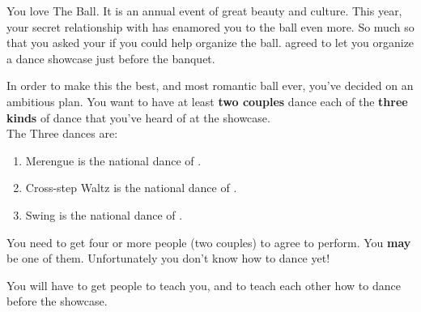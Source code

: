 \documentclass[green]{NeptuneBall}
\begin{document}
\name{\gDance{}}

You love The \cExExKing{} Ball. It is an annual event of great beauty and culture. This year, your secret relationship with \cDiplomat{} has enamored you to the ball even more. So much so that you asked your \cKing{\parent} if you could help organize the ball. \cKing{} agreed to let you organize a dance showcase just before the banquet.

In order to make this the best, and most romantic ball ever, you've decided on an ambitious plan.  You want to have at least {\bf two couples} dance each of the {\bf three  kinds} of dance that you've heard of at the showcase.\\

The Three dances are:
\begin{enumerate}
\item Merengue is the national dance of \pAtlantis{}.
\item Cross-step Waltz is the national dance of \pPacifica{}.
\item Swing is the national dance of \pAmerica{}.
\end{enumerate}

You need to get four or more people (two couples) to agree to perform. You {\bf may} be one of them. Unfortunately you don't know how to dance yet! 

You will have to get people to teach you, and to teach each other how to dance before the showcase.
\end{document}
